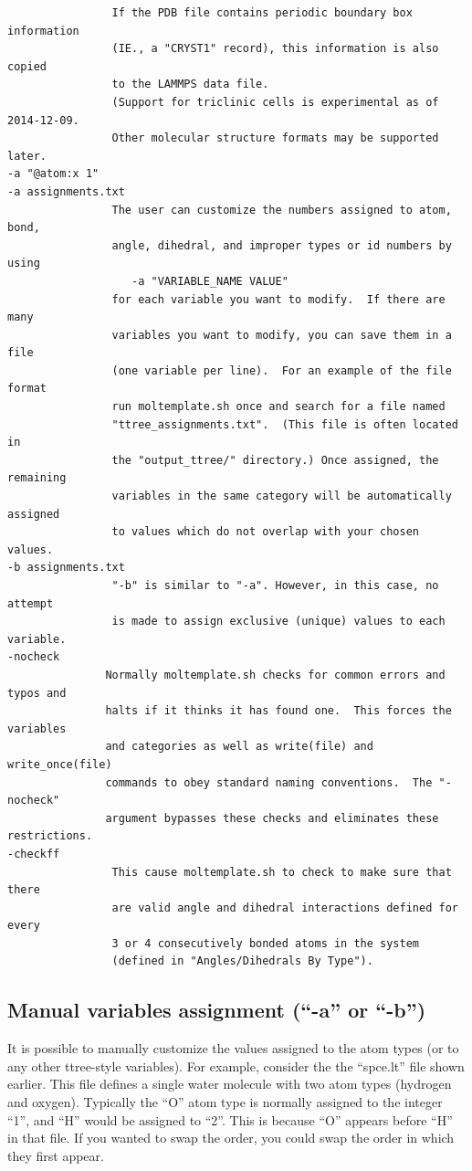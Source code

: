 \documentclass[11pt]{article}
\begin{document}
\begin{verbatim}
                If the PDB file contains periodic boundary box information 
                (IE., a "CRYST1" record), this information is also copied 
                to the LAMMPS data file.  
                (Support for triclinic cells is experimental as of 2014-12-09.
                Other molecular structure formats may be supported later.
-a "@atom:x 1"
-a assignments.txt
                The user can customize the numbers assigned to atom, bond,
                angle, dihedral, and improper types or id numbers by using
                   -a "VARIABLE_NAME VALUE"
                for each variable you want to modify.  If there are many
                variables you want to modify, you can save them in a file
                (one variable per line).  For an example of the file format
                run moltemplate.sh once and search for a file named
                "ttree_assignments.txt".  (This file is often located in
                the "output_ttree/" directory.) Once assigned, the remaining
                variables in the same category will be automatically assigned
                to values which do not overlap with your chosen values.
-b assignments.txt
                "-b" is similar to "-a". However, in this case, no attempt 
                is made to assign exclusive (unique) values to each variable.
-nocheck
               Normally moltemplate.sh checks for common errors and typos and
               halts if it thinks it has found one.  This forces the variables
               and categories as well as write(file) and write_once(file) 
               commands to obey standard naming conventions.  The "-nocheck"
               argument bypasses these checks and eliminates these restrictions.
-checkff
                This cause moltemplate.sh to check to make sure that there
                are valid angle and dihedral interactions defined for every
                3 or 4 consecutively bonded atoms in the system
                (defined in "Angles/Dihedrals By Type").
\end{verbatim}

\subsection{Manual variables assignment (``-a'' or ``-b'')}
\label{sec:manual_assignment}

It is possible to manually customize the values assigned 
to the atom types (or to any other ttree-style variables).
For example, consider the the ``spce.lt'' file shown earlier.
This file defines a single water molecule with two atom types
(hydrogen and oxygen).
Typically the ``O'' atom type is normally assigned to the integer ``1'',
and ``H'' would be assigned to ``2''.
This is because ``O'' appears before ``H'' in that file.
If you wanted to swap the order, you could swap the order
in which they first appear.
\end{document}
